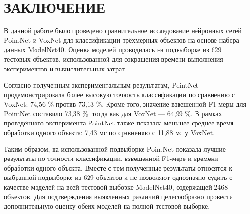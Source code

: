 \documentclass{misisarticle}
\begin{document}
\section{ЗАКЛЮЧЕНИЕ}
В данной работе было проведено сравнительное исследование нейронных сетей PointNet и VoxNet для классификации трёхмерных объектов на основе набора данных ModelNet40. Оценка моделей проводилась на подвыборке из 629 тестовых объектов, использованной для сокращения времени выполнения экспериментов и вычислительных затрат.\par
Согласно полученным экспериментальным результатам, PointNet продемонстрировала более высокую точность классификации по сравнению с VoxNet: 74,56 \% против 73,13 \%. Кроме того, значение взвешенной F1-меры для PointNet составило 73,38 \%, тогда как для VoxNet — 64,99 \%. В рамках проведённого эксперимента PointNet также показала меньшее среднее время обработки одного объекта: 7,43 мс по сравнению с 11,88 мс у VoxNet.\par
Таким образом, на использованной подвыборке PointNet показала лучшие результаты по точности классификации, взвешенной F1-мере и времени обработки одного объекта. Вместе с тем полученные результаты относятся к выбранной подвыборке из 629 объектов и не позволяют однозначно судить о качестве моделей на всей тестовой выборке ModelNet40, содержащей 2468 объектов. Для подтверждения выявленных различий целесообразно провести дополнительную оценку обеих моделей на полной тестовой выборке.\par
\FloatBarrier
\end{document}
